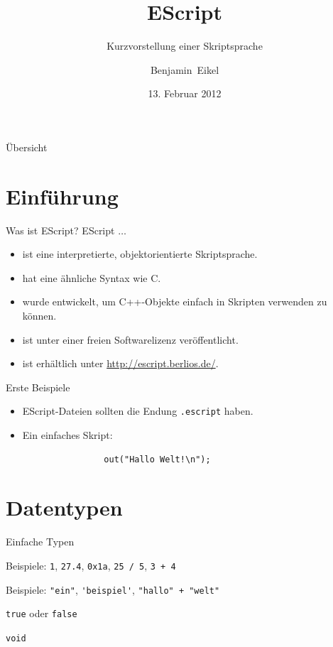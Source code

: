 \documentclass[ucs,9pt]{beamer}
\title{EScript}
\subtitle{Kurzvorstellung einer Skriptsprache}
\author{Benjamin~Eikel}
\date{13. Februar 2012}
\begin{document}
\lstset{language=EScript,showstringspaces=false,tabsize=4,basicstyle=\ttfamily}
\maketitle

\begin{frame}{Übersicht}
\tableofcontents
\end{frame}

\section{Einführung}
\begin{frame}{Was ist EScript?}
EScript $\ldots$ \\[1em]
\begin{itemize}
	\addtolength{\itemsep}{\baselineskip}
	\item ist eine interpretierte, objektorientierte Skriptsprache.
	\item hat eine ähnliche Syntax wie C.
	\item wurde entwickelt, um C++-Objekte einfach in Skripten verwenden zu können.
	\item ist unter einer freien Softwarelizenz veröffentlicht.
	\item ist erhältlich unter \url{http://escript.berlios.de/}.
\end{itemize}
\end{frame}

\begin{frame}[fragile]{Erste Beispiele}
\begin{itemize}
	\addtolength{\itemsep}{\baselineskip}
	\item EScript-Dateien sollten die Endung \texttt{.escript} haben.
	\item Ein einfaches Skript:
			\begin{lstlisting}
				out("Hallo Welt!\n");
			\end{lstlisting}
\end{itemize}
\end{frame}

\section{Datentypen}
\begin{frame}[fragile]{Einfache Typen}
\begin{description}
	\addtolength{\itemsep}{\baselineskip}
	\item[Number] Beispiele: \lstinline!1!, \lstinline!27.4!, \lstinline!0x1a!, \lstinline!25 / 5!, \lstinline!3 + 4!
	\item[String] Beispiele: \lstinline!"ein"!, \lstinline!'beispiel'!, \lstinline!"hallo" + "welt"!
	\item[Bool] \lstinline!true! oder \lstinline!false!
	\item[Void] \lstinline!void!
\end{description}
\end{frame}
\end{document}
